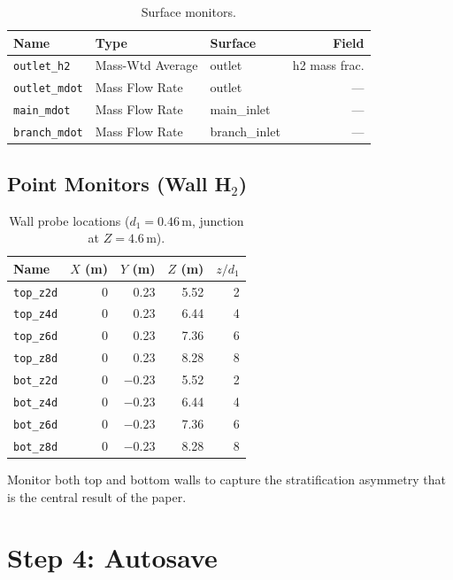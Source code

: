 \documentclass[12pt,a4paper]{report}
\begin{document}
\begin{table}[H]
\centering
\caption{Surface monitors.}
\begin{tabular}{@{}lllr@{}}
\toprule
\textbf{Name} & \textbf{Type} & \textbf{Surface} & \textbf{Field} \\
\midrule
\texttt{outlet\_h2}   & Mass-Wtd Average & outlet      & h2 mass frac. \\
\texttt{outlet\_mdot} & Mass Flow Rate   & outlet      & --- \\
\texttt{main\_mdot}   & Mass Flow Rate   & main\_inlet & --- \\
\texttt{branch\_mdot} & Mass Flow Rate   & branch\_inlet & --- \\
\bottomrule
\end{tabular}
\end{table}

\subsection{Point Monitors (Wall H$_2$)}

\begin{table}[H]
\centering
\caption{Wall probe locations ($d_1 = 0.46$\,m, junction at $Z = 4.6$\,m).}
\begin{tabular}{@{}lrrrr@{}}
\toprule
\textbf{Name} & $X$ (m) & $Y$ (m) & $Z$ (m) & $z/d_1$ \\
\midrule
\texttt{top\_z2d}    & 0 &  0.23 & 5.52 & 2 \\
\texttt{top\_z4d}    & 0 &  0.23 & 6.44 & 4 \\
\texttt{top\_z6d}    & 0 &  0.23 & 7.36 & 6 \\
\texttt{top\_z8d}    & 0 &  0.23 & 8.28 & 8 \\
\texttt{bot\_z2d}    & 0 & $-0.23$ & 5.52 & 2 \\
\texttt{bot\_z4d}    & 0 & $-0.23$ & 6.44 & 4 \\
\texttt{bot\_z6d}    & 0 & $-0.23$ & 7.36 & 6 \\
\texttt{bot\_z8d}    & 0 & $-0.23$ & 8.28 & 8 \\
\bottomrule
\end{tabular}
\end{table}

\noindent Monitor both top and bottom walls to capture the
stratification asymmetry that is the central result of the paper.


\section{Step 4: Autosave}
\end{document}
